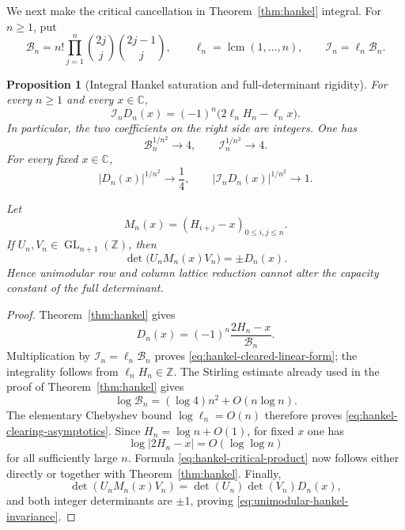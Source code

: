 \documentclass[11pt]{article}
\newtheorem{proposition}[theorem]{Proposition}
\theoremstyle{definition}
\theoremstyle{remark}
\newcommand{\C}{\mathbb C}
\newcommand{\Z}{\mathbb Z}
\begin{document}
We next make the critical cancellation in
Theorem~\ref{thm:hankel} integral.  For \(n\geq1\), put
\begin{equation}\label{eq:hankel-integral-clearing}
 \mathcal B_n
 =n!\prod_{j=1}^n
   \binom{2j}{j}\binom{2j-1}{j},
 \qquad
 \ell_n=\operatorname{lcm}(1,\ldots,n),
 \qquad
 \mathcal I_n=\ell_n\mathcal B_n.
\end{equation}

\begin{proposition}[Integral Hankel saturation and full-determinant rigidity]
\label{prop:hankel-integral-saturation}
For every \(n\geq1\) and every \(x\in\C\),
\begin{equation}\label{eq:hankel-cleared-linear-form}
 \mathcal I_nD_n(x)
 =(-1)^n\bigl(2\ell_nH_n-\ell_nx\bigr).
\end{equation}
In particular, the two coefficients on the right side are integers.  One
has
\begin{equation}\label{eq:hankel-clearing-asymptotics}
 \mathcal B_n^{1/n^2}\longrightarrow4,
 \qquad
 \mathcal I_n^{1/n^2}\longrightarrow4.
\end{equation}
For every fixed \(x\in\C\),
\begin{equation}\label{eq:hankel-critical-product}
 |D_n(x)|^{1/n^2}\longrightarrow\frac14,
 \qquad
 \boxed{
 |\mathcal I_nD_n(x)|^{1/n^2}\longrightarrow1.}
\end{equation}

Let
\[
 M_n(x)=(H_{i+j}-x)_{0\leq i,j\leq n}.
\]
If \(U_n,V_n\in\operatorname{GL}_{n+1}(\Z)\), then
\begin{equation}\label{eq:unimodular-hankel-invariance}
 \det\bigl(U_nM_n(x)V_n\bigr)=\pm D_n(x).
\end{equation}
Hence unimodular row and column lattice reduction cannot alter the
capacity constant of the full determinant.
\end{proposition}

\begin{proof}
Theorem~\ref{thm:hankel} gives
\[
 D_n(x)=(-1)^n\frac{2H_n-x}{\mathcal B_n}.
\]
Multiplication by \(\mathcal I_n=\ell_n\mathcal B_n\) proves
\eqref{eq:hankel-cleared-linear-form}; the integrality follows from
\(\ell_nH_n\in\Z\).  The Stirling estimate already used in the proof of
Theorem~\ref{thm:hankel} gives
\[
 \log\mathcal B_n=(\log4)n^2+O(n\log n).
\]
The elementary Chebyshev bound \(\log\ell_n=O(n)\) therefore proves
\eqref{eq:hankel-clearing-asymptotics}.  Since
\(H_n=\log n+O(1)\), for fixed \(x\) one has
\[
 \log|2H_n-x|=O(\log\log n)
\]
for all sufficiently large \(n\).  Formula
\eqref{eq:hankel-critical-product} now follows either directly or together
with Theorem~\ref{thm:hankel}.  Finally,
\[
 \det(U_nM_n(x)V_n)=\det(U_n)\det(V_n)D_n(x),
\]
and both integer determinants are \(\pm1\), proving
\eqref{eq:unimodular-hankel-invariance}.
\end{proof}
\end{document}
